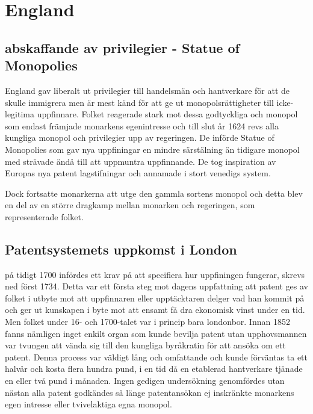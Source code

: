 \section{England} %
\label{sec:england}

\subsection{abskaffande av privilegier - Statue of Monopolies} %
\label{sub:abskaffande_av_privilegier_statue_of_monopolies}

England gav liberalt ut privilegier till handelsmän och hantverkare för att de skulle immigrera men är mest känd för att ge ut monopolsrättigheter till icke-legitima uppfinnare. Folket reagerade stark mot dessa godtyckliga och monopol som endast främjade monarkens egenintresse och till slut år 1624 revs alla kungliga monopol och privilegier upp av regeringen. De införde Statue of Monopolies som gav nya uppfiningar en mindre särstälning än tidigare monopol med strävade ändå till att uppmuntra uppfinnande. De tog inspiration av Europas nya patent lagstifningar och annamade i stort venedigs system. 

Dock fortsatte monarkerna att utge den gammla sortens monopol och detta blev en del av en större dragkamp mellan monarken och regeringen, som representerade folket. 


\subsection{Patentsystemets uppkomst i London} %
\label{sub:patentsystemets_uppkomst_i_london}


på tidigt 1700 infördes ett krav på att specifiera hur uppfiningen fungerar, skrevs ned först 1734. Detta var ett första steg mot dagens uppfattning att patent ges av folket i utbyte mot att uppfinnaren eller upptäcktaren delger vad han kommit på och ger ut kunskapen i byte mot att ensamt få dra ekonomisk vinst under en tid. Men folket under 16- och 1700-talet var i princip bara londonbor. Innan 1852 fanns nämligen inget enkilt organ som kunde bevilja patent utan upphovsmannen var tvungen att vända sig till den kungliga byråkratin för att ansöka om ett patent. Denna process var väldigt lång och omfattande och kunde förväntas ta ett halvår och kosta flera hundra pund, i en tid då en etablerad hantverkare tjänade en eller två pund i månaden. Ingen gedigen undersökning genomfördes utan nästan alla patent godkändes så länge patentansökan ej inskränkte monarkens egen intresse eller tvivelaktiga egna monopol.  

